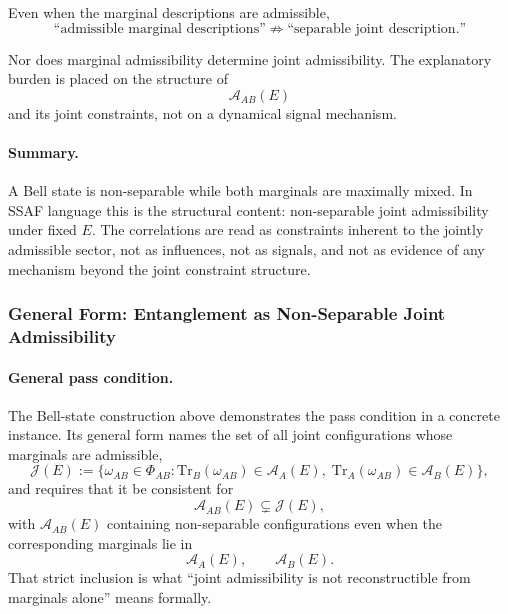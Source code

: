 \documentclass[aps,prx,onecolumn,11pt]{revtex4-2}
\theoremstyle{plain}
\theoremstyle{definition}
\theoremstyle{remark}
\begin{document}
Even when the marginal descriptions are admissible,
\[
\text{``admissible marginal descriptions''}
\;\not\Rightarrow\;
\text{``separable joint description.''}
\]

Nor does marginal admissibility determine joint admissibility. The
explanatory burden is placed on the structure of
\[
\mathcal A_{AB}(E)
\]
and its joint constraints, not on a dynamical signal mechanism.

\paragraph{Summary.}

A Bell state is non-separable while both marginals are maximally mixed.
In SSAF language this is the structural content: non-separable joint
admissibility under fixed \(E\). The correlations are read as
constraints inherent to the jointly admissible sector, not as
influences, not as signals, and not as evidence of any mechanism beyond
the joint constraint structure.

\subsubsection{General Form: Entanglement as Non-Separable Joint Admissibility}
\label{toy:entanglement_nonfactorizable}

\paragraph{General pass condition.}

The Bell-state construction above demonstrates the pass condition in a
concrete instance. Its general form names the set of all joint
configurations whose marginals are admissible,
\begin{equation}
\mathcal J(E)
:=
\bigl\{
\omega_{AB}\in\Phi_{AB}:
\mathrm{Tr}_B(\omega_{AB})\in\mathcal A_A(E),\;
\mathrm{Tr}_A(\omega_{AB})\in\mathcal A_B(E)
\bigr\},
\label{eq:toy_ent_JE}
\end{equation}
and requires that it be consistent for
\begin{equation}
\mathcal A_{AB}(E)\subsetneq\mathcal J(E),
\label{eq:toy_ent_strict_inclusion}
\end{equation}
with \(\mathcal A_{AB}(E)\) containing non-separable configurations
even when the corresponding marginals lie in
\[
\mathcal A_A(E),
\qquad
\mathcal A_B(E).
\]
That strict inclusion is what ``joint admissibility is not
reconstructible from marginals alone'' means formally.
\end{document}
